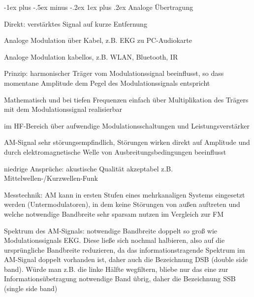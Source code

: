 \documentclass[a4paper]{article}
\makeatletter
\renewcommand{\subsubsection}{\@startsection{subsubsection}{3}{0mm}%
 {-1ex plus -.5ex minus -.2ex}%
 {1ex plus .2ex}%
 {\normalfont\small\bfseries}}
\makeatother
\begin{document}
\begin{multicols}{3}
  \subsubsection{Analoge Übertragung}\label{analoge-uxfcbertragung}
  \begin{itemize*}
    \item Direkt: verstärktes Signal auf kurze Entfernung
    \item Analoge Modulation über Kabel, z.B. EKG zu PC-Audiokarte
    \item Analoge Modulation kabellos, z.B. WLAN, Bluetooth, IR
    \item Prinzip: harmonischer Träger vom Modulationssignal beeinflusst, so dass momentane Amplitude dem Pegel des Modulationssignals entspricht
    \begin{itemize*}
      \item Mathematisch und bei tiefen Frequenzen einfach über Multiplikation des Trägers mit dem Modulationssignal realisierbar
      \item im HF-Bereich über aufwendige Modulationsschaltungen und Leistungsverstärker
      \item AM-Signal sehr störungsempfindlich, Störungen wirken direkt auf Amplitude und durch elektromagnetische Welle von Ausbreitungsbedingungen beeinflusst
      \item niedrige Ansprüche: akustische Qualität akzeptabel z.B. Mittelwellen-/Kurzwellen-Funk
      \item Messtechnik: AM kann in ersten Stufen eines mehrkanaligen Systems eingesetzt werden (Untermodulatoren), in dem keine Störungen von außen auftreten und welche notwendige Bandbreite sehr sparsam nutzen im Vergleich zur FM
    \end{itemize*}
    \item Spektrum des AM-Signals: notwendige Bandbreite doppelt so groß wie Modulationssignals EKG. Diese ließe sich nochmal halbieren, also auf die ursprüngliche Bandbreite reduzieren, da das informationstragende Spektrum im AM-Signal doppelt vorhanden ist, daher auch die Bezeichnung DSB (double side band). Würde man z.B. die linke Hälfte wegfiltern, bliebe nur das eine zur Informationsübetragung notwendige Band übrig, daher die Bezeichnung SSB (single side band)

\end{itemize*}
\end{multicols}
\end{document}
